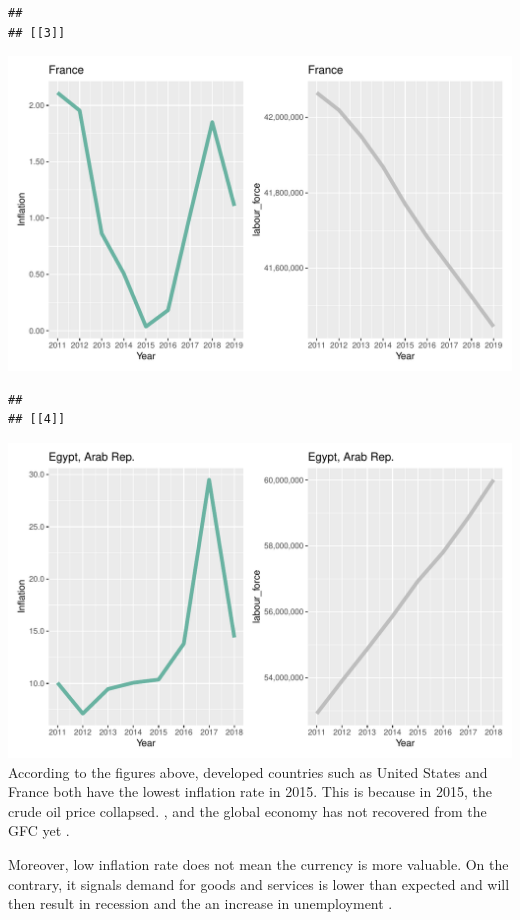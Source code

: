 \documentclass[11pt,a4paper,]{article}
\let\origfigure\figure
\let\endorigfigure\endfigure
\renewenvironment{figure}[1][2] {
    \expandafter\origfigure\expandafter[H]
} {
    \endorigfigure
}
\begin{document}
\begin{verbatim}
## 
## [[3]]
\end{verbatim}

\begin{figure}
\centering
\includegraphics{The_Outsiders_5513_files/figure-latex/A1-3.pdf}
\caption{\label{fig:A1-3}Inflation vs Labour force}
\end{figure}

\begin{verbatim}
## 
## [[4]]
\end{verbatim}

\includegraphics{The_Outsiders_5513_files/figure-latex/A1-4.pdf}
According to the figures above, developed countries such as United States and France both have the lowest inflation rate in 2015. This is because in 2015, the crude oil price collapsed. \autocite{stocker}, and the global economy has not recovered from the GFC yet \autocite{inflation1}.

Moreover, low inflation rate does not mean the currency is more valuable. On the contrary, it signals demand for goods and services is lower than expected and will then result in recession and the an increase in unemployment \autocite{inflation2}.
\end{document}
